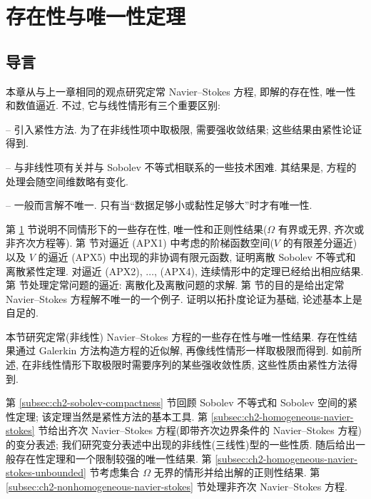 \hypertarget{chapter-02-page-120}{}
\section{存在性与唯一性定理}
\label{sec:ch2-existence-uniqueness}

\subsection*{导言}

本章从与上一章相同的观点研究定常 Navier--Stokes 方程, 即解的存在性, 唯一性和数值逼近. 不过, 它与线性情形有三个重要区别:

-- 引入紧性方法. 为了在非线性项中取极限, 需要强收敛结果; 这些结果由紧性论证得到.

-- 与非线性项有关并与 Sobolev 不等式相联系的一些技术困难. 其结果是, 方程的处理会随空间维数略有变化.

-- 一般而言解不唯一. 只有当``数据足够小或黏性足够大''时才有唯一性.

第 \ref{sec:ch2-existence-uniqueness} 节说明不同情形下的一些存在性, 唯一性和正则性结果($\Omega$ 有界或无界, 齐次或非齐次方程等). 第  节对逼近 (APX1) 中考虑的阶梯函数空间($V$ 的有限差分逼近)以及 $V$ 的逼近 (APX5) 中出现的非协调有限元函数, 证明离散 Sobolev 不等式和离散紧性定理. 对逼近 (APX2), $\ldots$, (APX4), 连续情形中的定理已经给出相应结果. 第  节处理定常问题的逼近: 离散化及离散问题的求解. 第  节的目的是给出定常 Navier--Stokes 方程解不唯一的一个例子. 证明以拓扑度论证为基础, 论述基本上是自足的.

本节研究定常(非线性) Navier--Stokes 方程的一些存在性与唯一性结果. 存在性结果通过 Galerkin 方法构造方程的近似解, 再像线性情形一样取极限而得到. 如前所述, 在非线性情形下取极限时需要序列的某些强收敛性质, 这些性质由紧性方法得到.

第 \ref{subsec:ch2-sobolev-compactness} 节回顾 Sobolev 不等式和 Sobolev 空间的紧性定理; 该定理当然是紧性方法的基本工具. 第 \ref{subsec:ch2-homogeneous-navier-stokes} 节给出齐次 Navier--Stokes 方程(即带齐次边界条件的 Navier--Stokes 方程)的变分表述; 我们研究变分表述中出现的非线性(三线性)型的一些性质. 随后给出一般存在性定理和一个限制较强的唯一性结果. 第 \ref{subsec:ch2-homogeneous-navier-stokes-unbounded} 节考虑集合 $\Omega$ 无界的情形并给出解的正则性结果. 第 \ref{subsec:ch2-nonhomogeneous-navier-stokes} 节处理非齐次 Navier--Stokes 方程.


